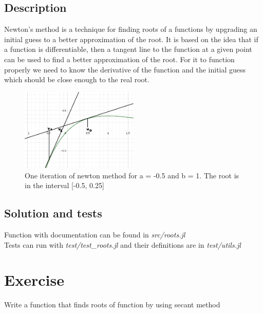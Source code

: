 \documentclass[11pt]{article}
\begin{document}
\subsection*{Description}
Newton's method is a technique for finding roots of a functions by upgrading an initial guess to a better approximation of the root.
It is based on the idea that if a function is differentiable, 
then a tangent line to the function at a given point can be used to find a better approximation of the root.
For it to function properly we need to know the derivative of the function and the initial guess which should be close enough to the real root.
\begin{figure}[h]
    \centering
    \includegraphics[width=0.5\textwidth]{newton_example.png}
    \caption{One iteration of newton method for a = -0.5 and b = 1. The root is in the interval [-0.5, 0.25]}
\end{figure}
\subsection*{Solution and tests}
Function with documentation can be found in \textit{src/roots.jl}\\
Tests can run with \textit{test/test\_roots.jl} and their definitions are in \textit{test/utils.jl}
\section{Exercise}
Write a function that finds roots of function by using secant method
\end{document}
